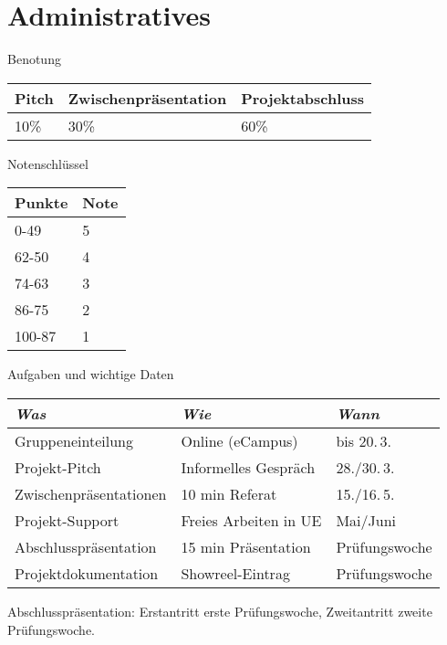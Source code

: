 
\section{Administratives}
 \frame{\sectionpage}

\begin{frame}{Benotung}

 
\begin{table}[]
\begin{tabular}{l|l|l}
Pitch & Zwischenpräsentation & Projektabschluss \\ \hline
10\%  & 30\%                & 60\%       
\end{tabular}
\end{table}



\end{frame}


\begin{frame}{Notenschlüssel}


 
\begin{table}[]
\begin{tabular}{l|l}
Punkte & Note \\ \hline
0-49   & 5    \\
62-50  & 4    \\
74-63  & 3    \\
86-75  & 2    \\
100-87 & 1   
\end{tabular}
\end{table}

\end{frame}


\begin{frame}{Aufgaben und wichtige Daten}
\begin{table}[]
\begin{tabular}{l|l|l}
\emph{Was}             &  \emph{Wie}           & \emph{Wann}	\\ \hline
Gruppeneinteilung      & Online (eCampus)      & bis 20.\,3.   \\
Projekt-Pitch          & Informelles Gespräch  & 28./30.\,3.	\\
Zwischenpräsentationen & 10 min Referat        & 15./16.\,5.	\\
Projekt-Support        & Freies Arbeiten in UE & Mai/Juni	\\
Abschlusspräsentation  & 15 min Präsentation   & Prüfungswoche \\
Projektdokumentation   & Showreel-Eintrag      & Prüfungswoche
\end{tabular}
\end{table}

Abschlusspräsentation: Erstantritt erste Prüfungswoche, Zweitantritt zweite Prüfungswoche.

\end{frame}



